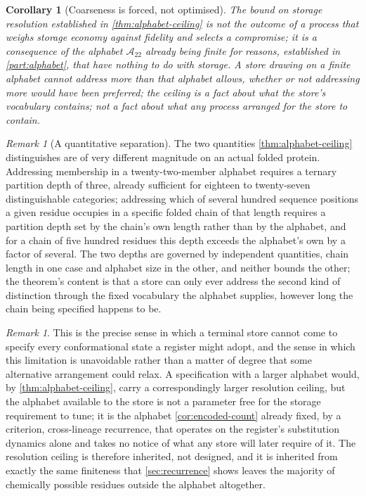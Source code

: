 \documentclass[11pt,twocolumn,a4paper]{article}
\theoremstyle{plain}
\newtheorem{corollary}[theorem]{Corollary}
\theoremstyle{definition}
\theoremstyle{remark}
\newtheorem{remark}[theorem]{Remark}
\newcommand{\Resset}{\mathcal{A}}
\begin{document}
\begin{corollary}[Coarseness is forced, not optimised]
\label{cor:coarseness-forced}
The bound on storage resolution established in
\cref{thm:alphabet-ceiling} is not the outcome of a process that weighs
storage economy against fidelity and selects a compromise; it is a
consequence of the alphabet $\Resset_{22}$ already being finite for
reasons, established in \cref{part:alphabet}, that have nothing to do with
storage. A store drawing on a finite alphabet cannot address more than
that alphabet allows, whether or not addressing more would have been
preferred; the ceiling is a fact about what the store's vocabulary
contains; not a fact about what any process arranged for the store to
contain.
\end{corollary}

\begin{remark}[A quantitative separation]
\label{rem:alphabet-ceiling-quantitative}
The two quantities \cref{thm:alphabet-ceiling} distinguishes are of very
different magnitude on an actual folded protein. Addressing membership in
a twenty-two-member alphabet requires a ternary partition depth of three,
already sufficient for eighteen to twenty-seven distinguishable
categories; addressing which of several hundred sequence positions a
given residue occupies in a specific folded chain of that length requires
a partition depth set by the chain's own length rather than by the
alphabet, and for a chain of five hundred residues this depth exceeds the
alphabet's own by a factor of several. The two depths are governed by
independent quantities, chain length in one case and alphabet size in the
other, and neither bounds the other; the theorem's content is that a
store can only ever address the second kind of distinction through the
fixed vocabulary the alphabet supplies, however long the chain being
specified happens to be.
\end{remark}

\begin{remark}
This is the precise sense in which a terminal store cannot come to specify
every conformational state a register might adopt, and the sense in which
this limitation is unavoidable rather than a matter of degree that some
alternative arrangement could relax. A specification with a larger
alphabet would, by \cref{thm:alphabet-ceiling}, carry a correspondingly
larger resolution ceiling, but the alphabet available to the store is not
a parameter free for the storage requirement to tune; it is the alphabet
\cref{cor:encoded-count} already fixed, by a criterion, cross-lineage
recurrence, that operates on the register's substitution dynamics alone
and takes no notice of what any store will later require of it. The
resolution ceiling is therefore inherited, not designed, and it is
inherited from exactly the same finiteness that \cref{sec:recurrence}
shows leaves the majority of chemically possible residues outside the
alphabet altogether.
\end{remark}
\end{document}
